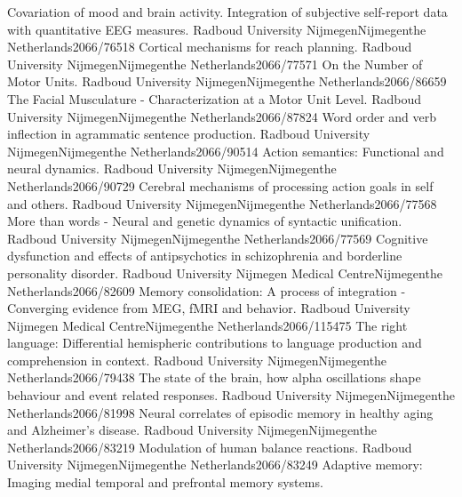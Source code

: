 	{Covariation of mood and brain activity. Integration of subjective self-report data with quantitative EEG measures.}
	{Radboud University Nijmegen}{Nijmegen}{the Netherlands}{2066/76518}
	{Cortical mechanisms for reach planning.}
	{Radboud University Nijmegen}{Nijmegen}{the Netherlands}{2066/77571}
	{On the Number of Motor Units.}
	{Radboud University Nijmegen}{Nijmegen}{the Netherlands}{2066/86659}
	{The Facial Musculature - Characterization at a Motor Unit Level.}
	{Radboud University Nijmegen}{Nijmegen}{the Netherlands}{2066/87824}
	{Word order and verb inflection in agrammatic sentence production.}
	{Radboud University Nijmegen}{Nijmegen}{the Netherlands}{2066/90514}
	{Action semantics: Functional and neural dynamics.}
	{Radboud University Nijmegen}{Nijmegen}{the Netherlands}{2066/90729}
	{Cerebral mechanisms of processing action goals in self and others.}
	{Radboud University Nijmegen}{Nijmegen}{the Netherlands}{2066/77568}
	{More than words - Neural and genetic dynamics of syntactic unification.}
	{Radboud University Nijmegen}{Nijmegen}{the Netherlands}{2066/77569}
	{Cognitive dysfunction and effects of antipsychotics in schizophrenia and borderline personality disorder.}
	{Radboud University Nijmegen Medical Centre}{Nijmegen}{the Netherlands}{2066/82609}
	{Memory consolidation: A process of integration - Converging evidence from MEG, fMRI and behavior.}
	{Radboud University Nijmegen Medical Centre}{Nijmegen}{the Netherlands}{2066/115475}
	{The right language: Differential hemispheric contributions to language production and comprehension in context.}
	{Radboud University Nijmegen}{Nijmegen}{the Netherlands}{2066/79438}
	{The state of the brain, how alpha oscillations shape behaviour and event related responses.}
	{Radboud University Nijmegen}{Nijmegen}{the Netherlands}{2066/81998}
	{Neural correlates of episodic memory in healthy aging and Alzheimer's disease.}
	{Radboud University Nijmegen}{Nijmegen}{the Netherlands}{2066/83219}
	{Modulation of human balance reactions.}
	{Radboud University Nijmegen}{Nijmegen}{the Netherlands}{2066/83249}
	{Adaptive memory: Imaging medial temporal and prefrontal memory systems.}
